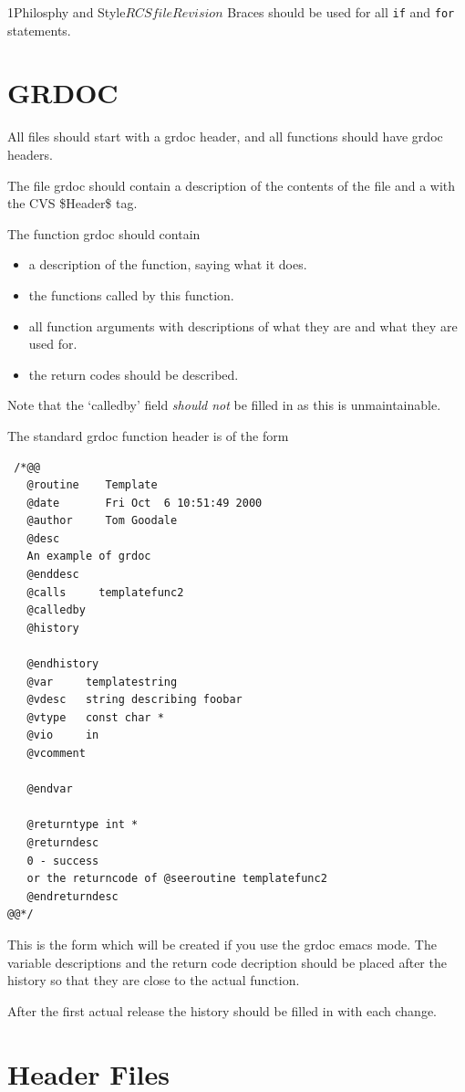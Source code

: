 \begin{cactuspart}{1}{Philosphy and Style}{$RCSfile$}{$Revision$}
Braces should be used for all {\tt if} and {\tt for} statements.

\section{GRDOC}

All files should start with a grdoc header, and all functions
should have grdoc headers.

The file grdoc should contain a description of the contents of the file
and a \@version with the CVS \$Header\$ tag.

The function grdoc should contain

\begin{itemize}
\item
a description of the function, saying what it does.
\item
the functions called by this function.
\item
all function arguments with descriptions
of what they are and what they are used for.
\item
the return codes should be described.
\end{itemize}

Note that the `calledby' field {\em should not} be filled in as
this is unmaintainable.

The standard grdoc function header is of the form

\begin{verbatim}
 /*@@
   @routine    Template
   @date       Fri Oct  6 10:51:49 2000
   @author     Tom Goodale
   @desc
   An example of grdoc
   @enddesc
   @calls     templatefunc2
   @calledby
   @history

   @endhistory
   @var     templatestring
   @vdesc   string describing foobar
   @vtype   const char *
   @vio     in
   @vcomment

   @endvar

   @returntype int *
   @returndesc
   0 - success
   or the returncode of @seeroutine templatefunc2
   @endreturndesc
@@*/
\end{verbatim}

This is the form which will be created if you use the grdoc emacs mode.  
The variable descriptions and the return code decription should be placed
after the history so that they are close to the actual function.

After the first actual release the history should be filled
in with each change.

\section{Header Files}


\end{cactuspart}
